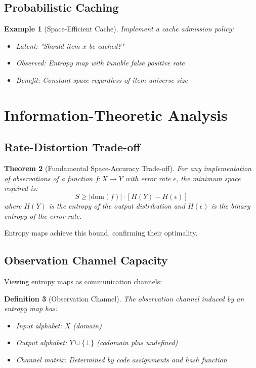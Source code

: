 \documentclass[11pt,final,hidelinks]{article}
\newtheorem{theorem}{Theorem}[section]
\newtheorem{definition}[theorem]{Definition}
\newtheorem{example}[theorem]{Example}
\newcommand{\Card}[1]{\lvert#1\rvert}
\newcommand{\error}{\epsilon}
\begin{document}
\subsection{Probabilistic Caching}

\begin{example}[Space-Efficient Cache]
Implement a cache admission policy:
\begin{itemize}
    \item Latent: "Should item $x$ be cached?"
    \item Observed: Entropy map with tunable false positive rate
    \item Benefit: Constant space regardless of item universe size
\end{itemize}
\end{example}

\section{Information-Theoretic Analysis}

\subsection{Rate-Distortion Trade-off}

\begin{theorem}[Fundamental Space-Accuracy Trade-off]
For any implementation of observations of a function $f: X \to Y$ with error rate $\error$, the minimum space required is:
\begin{equation}
S \geq \Card{\text{dom}(f)} \cdot [H(Y) - H(\error)]
\end{equation}
where $H(Y)$ is the entropy of the output distribution and $H(\error)$ is the binary entropy of the error rate.
\end{theorem}

Entropy maps achieve this bound, confirming their optimality.

\subsection{Observation Channel Capacity}

Viewing entropy maps as communication channels:

\begin{definition}[Observation Channel]
The observation channel induced by an entropy map has:
\begin{itemize}
    \item Input alphabet: $X$ (domain)
    \item Output alphabet: $Y \cup \{\bot\}$ (codomain plus undefined)
    \item Channel matrix: Determined by code assignments and hash function
\end{itemize}
\end{definition}
\end{document}
